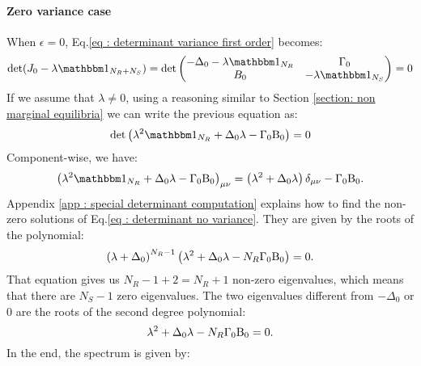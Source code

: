 \documentclass[12pt, titlepage]{report}
\begin{document}
	\paragraph{Zero variance case}\label{sec : methods dynamical stability fully connected zero variance}
	When $\epsilon=0$, Eq.\eqref{eq : determinant variance first order} becomes:
	\begin{equation}
	\det(J_0-\lambda \identity{N_R+N_S})=\det\begin{pmatrix}
	-\Delta_0-\lambda \identity{N_R} & \Gamma_0 \\
	B_0 & -\lambda \identity{N_S}
	\end{pmatrix}
	=
	0
	\end{equation}
	If we assume that $\lambda\neq 0$, using a reasoning similar to Section \ref{section: non marginal equilibria} we can write the previous equation as:
	\begin{equation}
	\det\left(\lambda^2 \identity{N_R}+\Delta_0 \lambda - \Gamma_0 \Beta_0 \right)=0 \label{eq : determinant no variance}
	\end{equation}
	Component-wise, we have:
	\begin{equation}
	\left(\lambda^2 \identity{N_R}+\Delta_0 \lambda - \Gamma_0 \Beta_0 \right)_{\mu\nu} = \left(\lambda^2+\Delta_0 \lambda\right)\delta_{\mu \nu} - \Gamma_0\Beta_0.
	\end{equation}
	Appendix \ref{app : special determinant computation} explains how to find the non-zero solutions of Eq.\eqref{eq : determinant no variance}. They are given by the roots of the polynomial:
	\begin{equation}
	\left(\lambda+\Delta_0\right)^{N_R-1}\left(\lambda^2+\Delta_0 \lambda -N_R \Gamma_0 \text{B}_0\right)=0.
	\end{equation}
	That equation gives us $N_R-1+2=N_R+1$ non-zero eigenvalues, which means that there are $N_S-1$ zero eigenvalues. The two eigenvalues different from $-\Delta_0$ or $0$ are the roots of the second degree polynomial:
	\begin{equation}
	\lambda^2 + \Delta_0 \lambda- N_R \Gamma_0 \text{B}_0 =0.
	\end{equation}
	In the end, the spectrum is given by:
\end{document}
